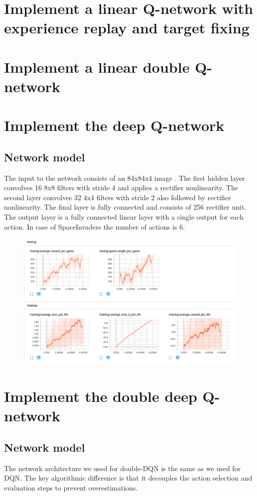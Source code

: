 \documentclass{article}
\begin{document}
\section*{Implement a linear Q-network with experience replay and target fixing}

\section*{Implement a linear double Q-network}

\section*{Implement the deep Q-network}
\subsection*{Network model}
The input to the network consists of an 84x84x4 image . The first hidden layer convolves 16 8x8 filters with stride 4 and applies a rectifier nonlinearity. The second layer convolves 32 4x4 filters with stride 2 also followed by rectifier nonlinearity. The final layer is fully connected and consists of 256 rectifier unit. The output layer is a fully connected linear layer with a single output for each action. In case of SpaceInvaders the number of actions is 6.

\begin{figure}[h]
\centering
\includegraphics[scale=0.3]{dqn.png}
\end{figure}

\section*{Implement the double deep Q-network}
\subsection*{Network model}
The network architecture we used for double-DQN is the same as we used for DQN. The key algorithmic difference is that it decouples the action selection and evaluation steps to prevent overestimations.
\end{document}
